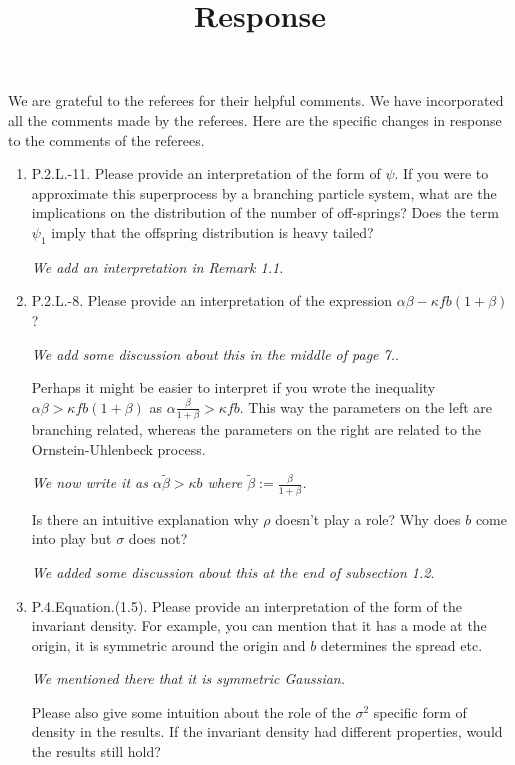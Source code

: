 \documentclass[12pt,a4paper]{amsart}
\numberwithin{equation}{section}
\theoremstyle{plain}
\theoremstyle{definition}
\begin{document}
\title
[Response]
{Response}
\maketitle
We are grateful to the referees for their helpful comments.
We have incorporated all the comments made by the referees.
Here are the specific changes in response to the comments of the referees.
\begin{enumerate}
\item
  P.2.L.-11. 
  Please provide an interpretation of the form of $\psi$. 
  If you were to approximate this superprocess by a branching particle system, what are the implications on the distribution of the number of off-springs? 
  Does the term $\psi_1$ imply that the offspring distribution is heavy tailed? 

  \emph{We add an interpretation in Remark 1.1.}
\item
  P.2.L.-8. 
  Please provide an interpretation of the expression $\alpha\beta - \kappa f b(1+\beta)$?
  
\emph{We add some discussion about this in the middle of page 7.}.
  
  Perhaps it might be easier to interpret if you wrote the inequality $\alpha \beta > \kappa f b(1 + \beta)$ as $\alpha \frac{\beta}{1+\beta} > \kappa f b$.
  This way the parameters on the left are branching related, whereas the parameters on the right are related to the Ornstein-Uhlenbeck process. 

  \emph{We now write it as $\alpha \tilde \beta > \kappa b$ where $\tilde \beta := \frac{\beta}{1+\beta}$.}

  Is there an intuitive explanation why $\rho$ doesn’t play a role? 
  Why does $b$ come into play but $\sigma$ does not?
  
  \emph{We added some discussion about this at the end of subsection 1.2}.
\item
  P.4.Equation.(1.5). 
  Please provide an interpretation of the form of the invariant density. 
  For example, you can mention that it has a mode at the origin, it is symmetric around the origin and $b$ determines the spread etc. 
  
\emph{We mentioned there that it is symmetric Gaussian.}

  Please also give some intuition about the role of the $\sigma^2$ specific form of density in the results. 
  If the invariant density had different properties, would the results still hold?
  

\end{enumerate}
\end{document}
